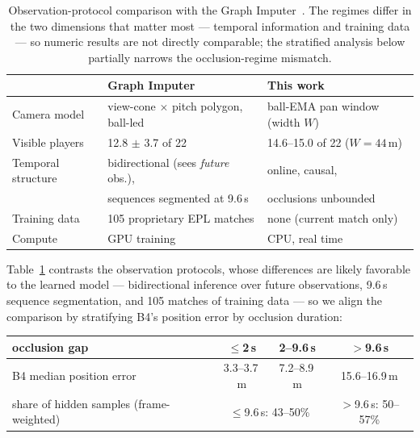 \documentclass[11pt]{article}
\begin{document}
\begin{table}[t]
\centering
\caption{Observation-protocol comparison with the Graph
Imputer~\citep{omidshafiei2022}. The regimes differ in the two dimensions that
matter most --- temporal information and training data --- so numeric results
are not directly comparable; the stratified analysis below partially narrows the
occlusion-regime mismatch.}
\label{tab:protocol}
\small
\begin{tabular}{lll}
\toprule
& Graph Imputer & This work \\
\midrule
Camera model & view-cone $\times$ pitch polygon, ball-led & ball-EMA pan window (width $W$) \\
Visible players & 12.8 $\pm$ 3.7 of 22 & 14.6--15.0 of 22 ($W=44$\,m) \\
Temporal structure & bidirectional (sees \emph{future} obs.), & online, causal, \\
& sequences segmented at 9.6\,s & occlusions unbounded \\
Training data & 105 proprietary EPL matches & none (current match only) \\
Compute & GPU training & CPU, real time \\
\bottomrule
\end{tabular}
\end{table}

Table~\ref{tab:protocol} contrasts the observation protocols, whose
differences are likely favorable to the learned model --- bidirectional
inference over future observations, 9.6\,s sequence segmentation, and 105
matches of training data --- so we align the comparison by stratifying B4's
position error by occlusion duration:

\begin{center}
\small
\begin{tabular}{lccc}
\toprule
occlusion gap & $\le$2\,s & 2--9.6\,s & $>$9.6\,s \\
\midrule
B4 median position error & 3.3--3.7\,m & 7.2--8.9\,m & 15.6--16.9\,m \\
share of hidden samples (frame-weighted) & \multicolumn{2}{c}{$\le$9.6\,s: 43--50\%} & $>$9.6\,s: 50--57\% \\
\bottomrule
\end{tabular}
\end{center}
\end{document}
